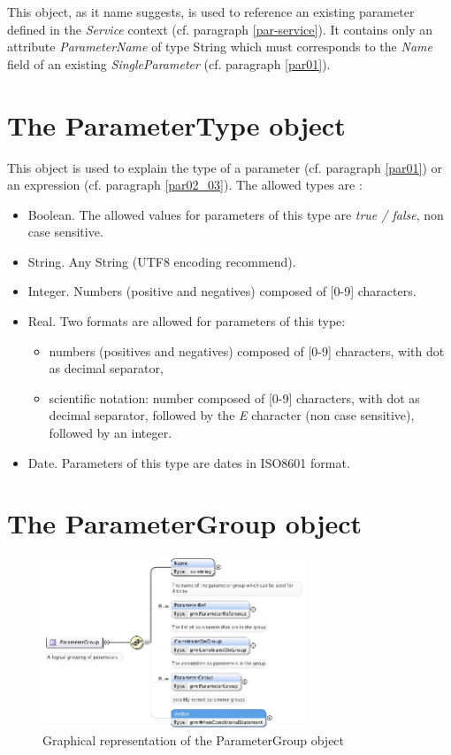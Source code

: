 \documentclass[a4paper,11pt] {ivoa}
\begin{document}
This object, as it name suggests, is used to reference an existing parameter defined in the {\it
Service} context (cf. paragraph
\ref{par-service}). It  contains only an attribute {\it ParameterName} of type String which
must corresponds to the {\it Name} field of an existing {\it SingleParameter} (cf. paragraph \ref {par01}).

\section{The ParameterType object}\label{par-ParameterType}
This object is used to explain the type of a parameter (cf. paragraph \ref{par01}) or an expression
(cf. paragraph \ref{par02_03}). The allowed types are : 
\begin{itemize}
\item Boolean. The allowed values for parameters of this type are {\it true / false}, non case sensitive.
\item String. Any String (UTF8 encoding recommend).
\item Integer. Numbers (positive and negatives) composed of [0-9] characters. 
\item Real. Two formats are allowed for parameters of this type: 
\begin{itemize}
\item numbers (positives and negatives) composed of [0-9] characters, with dot as decimal separator, 
\item scientific notation: number composed of [0-9] characters, with dot as decimal separator, followed by the {\it E} character (non case sensitive), followed by an integer. 
\end{itemize}
\item Date. Parameters of this type are dates in ISO8601 format.
\end{itemize}

\section{The ParameterGroup object}\label{par-group}

\begin{figure}[htbp]
\begin{center}
\includegraphics[width=0.7\textwidth]{pictures/ParameterGroup.jpg} 
\caption{Graphical representation of the ParameterGroup object}
\label{Pic-ParameterGroup}
\end{center}
\end{figure}
\end{document}
